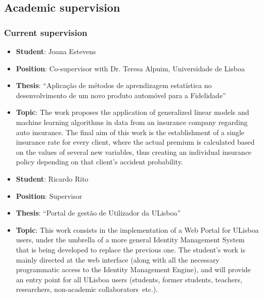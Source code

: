 \subsection{Academic supervision} \label{sub:academic-supervision}

\subsubsection{Current supervision}

\begin{itemize}
    \item \textbf{Student}: Joana Estevens
    \item \textbf{Position}: Co-supervisor with Dr. Teresa Alpuim, Universidade de Lisboa
    \item \textbf{Thesis}: ``Aplicação de métodos de aprendizagem estatística no desenvolvimento de um novo produto automóvel para a Fidelidade''
    \item \textbf{Topic}: The work proposes the application of generalized linear models and machine learning algorithms in data from an insurance company regarding auto insurance. The final aim of this work is the establishment of a single insurance rate for every client, where the actual premium is calculated based on the values of several new variables, thus creating an individual insurance policy depending on that client's accident probability.
\end{itemize}


\begin{itemize}
    \item \textbf{Student}: Ricardo Rito
    \item \textbf{Position}: Supervisor
    \item \textbf{Thesis}: ``Portal de gestão de Utilizador da ULisboa''
    \item \textbf{Topic}: This work consists in the implementation of a Web Portal for ULisboa users, under the umbrella of a more general Identity Management System that is being developed to replace the previous one. The student's work is mainly directed at the web interface (along with all the necessary programmatic access to the Identity Management Engine), and will provide an entry point for all ULisboa users (students, former students, teachers, researchers, non-academic collaborators~etc.).
\end{itemize}


